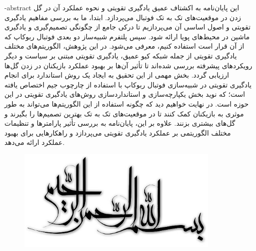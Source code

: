\department{}

\fa-abstract{
    این پایان‌نامه به اکشتاف عمیق یادگیری تقویتی و نحوه عملکرد آن در گل زدن در موقعیت‌های تک به تک فوتبال می‌پردازد.
     ابتدا، ما به بررسی مفاهیم یادگیری تقویتی و اصول اساسی آن می‌پردازیم تا درکی جامع از چگونگی تصمیم‌گیری و یادگیری ماشین در محیط‌های پویا ارائه شود.
     سپس پلتفرم شبیه‌ساز دو بعدی فوتبال ربوکاپ که از آن قرار است استفاده کنیم، معرفی می‌شود.
     در این پژوهش، الگوریتم‌های مختلف یادگیری تقویتی از جمله شبکه کیو
      عمیق، یادگیری تقویتی مبتنی بر سیاست و دیگر رویکردهای پیشرفته بررسی شده‌اند تا تأثیر آن‌ها بر بهبود عملکرد بازیکنان در زدن گل‌ها ارزیابی گردد.
      بخش مهمی از این تحقیق به ایجاد یک روش استاندارد برای انجام یادگیری تقویتی در شبیه‌سازی فوتبال ربوکاپ با استفاده از چارچوب جیم اختصاص یافته است؛ که نوید بخش یکپارچه‌سازی و استانداردسازی روش‌های یادگیری تقویتی در این حوزه است.
        در نهایت خواهیم دید که چگونه استفاده از این الگوریتم‌ها می‌تواند به طور موثری به بازیکنان کمک کنند تا در موقعیت‌های تک به تک بهترین تصمیم‌ها را بگیرند و گل‌های بیشتری بزنند.
        علاوه بر این، پایان‌نامه به بررسی تأثیر پارامترها و تنظیمات مختلف الگوریتمی بر عملکرد یادگیری تقویتی می‌پردازد و راهکارهایی برای بهبود عملکرد ارائه می‌دهد.
}




\vspace*{7cm}
\thispagestyle{empty}
\begin{center}
\includegraphics[height=5cm,width=12cm]{besm}
\end{center}